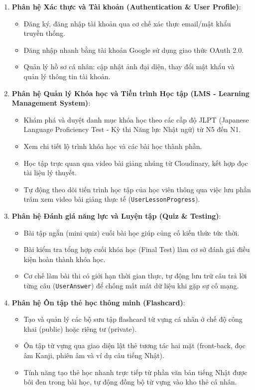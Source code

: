 \documentclass[../DoAn.tex]{subfiles}
\begin{document}
\begin{enumerate}
    \item \textbf{Phân hệ Xác thực và Tài khoản (Authentication \& User Profile)}:
    \begin{itemize}
        \item Đăng ký, đăng nhập tài khoản qua cơ chế xác thực email/mật khẩu truyền thống.
        \item Đăng nhập nhanh bằng tài khoản Google sử dụng giao thức OAuth 2.0.
        \item Quản lý hồ sơ cá nhân: cập nhật ảnh đại diện, thay đổi mật khẩu và quản lý thông tin tài khoản.
    \end{itemize}

    \item \textbf{Phân hệ Quản lý Khóa học và Tiến trình Học tập (LMS - Learning Management System)}:
    \begin{itemize}
        \item Khám phá và duyệt danh mục khóa học theo các cấp độ JLPT (Japanese Language Proficiency Test - Kỳ thi Năng lực Nhật ngữ) từ N5 đến N1.
        \item Xem chi tiết lộ trình khóa học và các bài học thành phần.
        \item Học tập trực quan qua video bài giảng nhúng từ Cloudinary, kết hợp đọc tài liệu lý thuyết.
        \item Tự động theo dõi tiến trình học tập của học viên thông qua việc lưu phần trăm xem video bài giảng thực tế (\texttt{UserLessonProgress}).
    \end{itemize}

    \item \textbf{Phân hệ Đánh giá năng lực và Luyện tập (Quiz \& Testing)}:
    \begin{itemize}
        \item Bài tập ngắn (mini quiz) cuối bài học giúp củng cố kiến thức tức thời.
        \item Bài kiểm tra tổng hợp cuối khóa học (Final Test) làm cơ sở đánh giá điều kiện hoàn thành khóa học.
        \item Cơ chế làm bài thi có giới hạn thời gian thực, tự động lưu trữ câu trả lời từng câu (\texttt{UserAnswer}) để chống mất mát dữ liệu khi gặp sự cố mạng.
    \end{itemize}

    \item \textbf{Phân hệ Ôn tập thẻ học thông minh (Flashcard)}:
    \begin{itemize}
        \item Tạo và quản lý các bộ sưu tập flashcard từ vựng cá nhân ở chế độ công khai (public) hoặc riêng tư (private).
        \item Ôn tập từ vựng qua giao diện lật thẻ tương tác hai mặt (front-back, đọc âm Kanji, phiên âm và ví dụ câu tiếng Nhật).
        \item Tính năng tạo thẻ học nhanh trực tiếp từ phần văn bản tiếng Nhật được bôi đen trong bài học, tự động đồng bộ từ vựng vào kho thẻ cá nhân.
    \end{itemize}


\end{enumerate}
\end{document}
